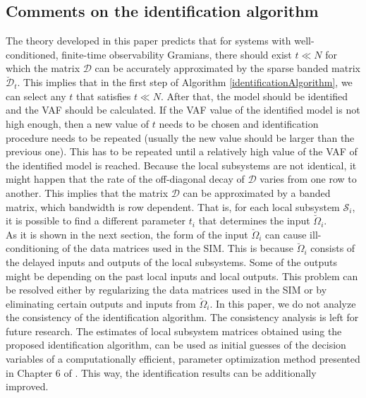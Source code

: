 \documentclass[journal,10pt]{IEEEtran}
\begin{document}
\subsection{Comments on the identification algorithm}
\label{commentsSubSection}
The theory developed in this paper predicts that for systems with well-conditioned, finite-time observability Gramians, there should exist $t\ll N$ for which the matrix $\mathcal{D}$ can be accurately approximated by the sparse banded matrix $\breve{\mathcal{D}}_{t}$. This implies that in the first step of Algorithm \ref{identificationAlgorithm}, we can select any $t$ that satisfies $t\ll N$.  
After that, the model should be identified and the VAF should be calculated. If the VAF value of the identified model is not high enough, then a new value of $t$ needs to be chosen and identification procedure needs to be repeated (usually the new value should be larger than the previous one). This has to be repeated until a relatively high value of the VAF of the identified model is reached. Because the local subsystems are not identical, it might happen that the rate of the off-diagonal decay of $\mathcal{D}$ varies from one row to another. This implies that the matrix $\mathcal{D}$ can be approximated by a banded matrix, which bandwidth is row dependent. That is, for each local subsystem $\mathcal{S}_{i}$, it is possible to find a different parameter $t_{i}$ that determines the input $\breve{\Omega}_{i}$.  
\\
As it is shown in the next section, the form of the input $\breve{\Omega}_{i}$ can cause ill-conditioning of the data  matrices used in the SIM. This is because $\breve{\Omega}_{i}$ consists of the delayed inputs and outputs of the local subsystems. Some of the outputs might be depending on the past local inputs and local outputs. This problem can be resolved either by regularizing the data matrices used in the SIM or by eliminating certain outputs and inputs from $\breve{\Omega}_{i}$. In this paper, we do not analyze the consistency of the identification algorithm. The consistency analysis is left for future research. The estimates of local subsystem matrices obtained using the proposed identification algorithm, can be used as initial guesses of the decision variables of a computationally efficient, parameter optimization method presented in Chapter 6 of \cite{haberThesis}. This way, the identification results can be additionally improved.
\end{document}
